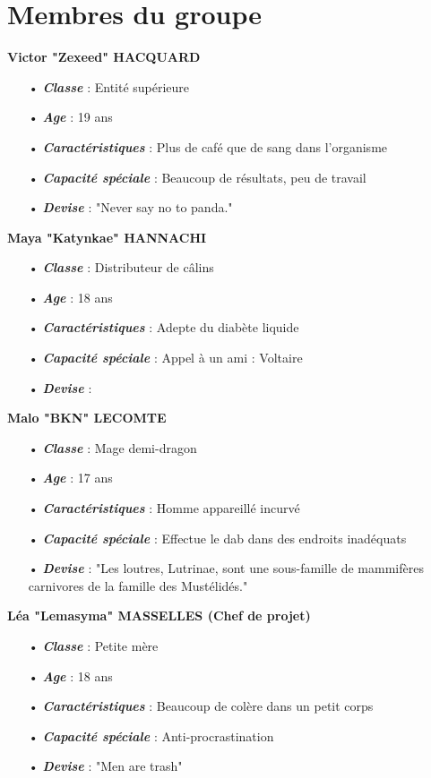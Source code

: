\documentclass{article}
\begin{document}
\section{Membres du groupe}
\vspace{0.3cm}\hspace{-0.7cm}
\textbf{Victor "Zexeed" HACQUARD}
\begin{itemize}
\item[•] \textbf{\textit{Classe}} : Entité supérieure
\item[•] \textbf{\textit{Age}} : 19 ans
\item[•] \textbf{\textit{Caractéristiques}} : Plus de café que de sang dans l'organisme
\item[•] \textbf{\textit{Capacité spéciale}} : Beaucoup de résultats, peu de travail
\item[•] \textbf{\textit{Devise}} : "Never say no to panda."
\end{itemize}
\vspace{0.3cm}
\textbf{Maya "Katynkae" HANNACHI}
\begin{itemize}
\item[•] \textbf{\textit{Classe}} : Distributeur de câlins
\item[•] \textbf{\textit{Age}} : 18 ans
\item[•] \textbf{\textit{Caractéristiques}} : Adepte du diabète liquide 
\item[•] \textbf{\textit{Capacité spéciale}} : Appel à un ami : Voltaire
\item[•] \textbf{\textit{Devise}} : 
\end{itemize}
\vspace{0.3cm}
\textbf{Malo "BKN" LECOMTE}
\begin{itemize}
\item[•] \textbf{\textit{Classe}} : Mage demi-dragon
\item[•] \textbf{\textit{Age}} : 17 ans
\item[•] \textbf{\textit{Caractéristiques}} : Homme appareillé incurvé
\item[•] \textbf{\textit{Capacité spéciale}} : Effectue le dab dans des endroits inadéquats
\item[•] \textbf{\textit{Devise}} : "Les loutres, Lutrinae, sont une sous-famille de mammifères carnivores de la famille des Mustélidés."
\end{itemize}
\vspace{0.3cm}
\textbf{Léa "Lemasyma" MASSELLES (Chef de projet)}
\begin{itemize}
\item[•] \textbf{\textit{Classe}} : Petite mère
\item[•] \textbf{\textit{Age}} : 18 ans
\item[•] \textbf{\textit{Caractéristiques}} : Beaucoup de colère dans un petit corps
\item[•] \textbf{\textit{Capacité spéciale}} : Anti-procrastination
\item[•] \textbf{\textit{Devise}} : "Men are trash"
\end{itemize}
\end{document}
